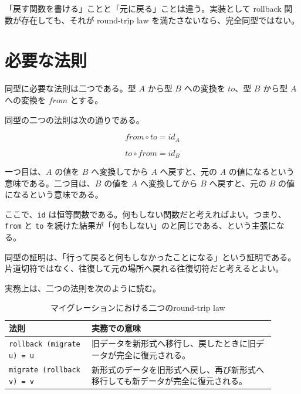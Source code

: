 
\begin{warningbox}
「戻す関数を書ける」ことと「元に戻る」ことは違う。実装として rollback 関数が存在しても、それが round-trip law を満たさないなら、完全同型ではない。
\end{warningbox}

\section{必要な法則}
\label{sec:ch06-laws}

同型に必要な法則は二つである。型 $A$ から型 $B$ への変換を $\mathit{to}$、型 $B$ から型 $A$ への変換を $\mathit{from}$ とする。

\begin{definitionbox}
同型の二つの法則は次の通りである。

\[
  \mathit{from} \circ \mathit{to} = \mathit{id}_A
\]

\[
  \mathit{to} \circ \mathit{from} = \mathit{id}_B
\]

一つ目は、$A$ の値を $B$ へ変換してから $A$ へ戻すと、元の $A$ の値になるという意味である。二つ目は、$B$ の値を $A$ へ変換してから $B$ へ戻すと、元の $B$ の値になるという意味である。
\end{definitionbox}

ここで、\texttt{id} は恒等関数である。何もしない関数だと考えればよい。つまり、\texttt{from} と \texttt{to} を続けた結果が「何もしない」のと同じである、という主張になる。

\begin{intuitionbox}
同型の証明は、「行って戻ると何もしなかったことになる」という証明である。片道切符ではなく、往復して元の場所へ戻れる往復切符だと考えるとよい。
\end{intuitionbox}

実務上は、二つの法則を次のように読む。

\begin{table}[htbp]
\centering
\begin{tabular}{p{0.28\linewidth}p{0.62\linewidth}}
\toprule
法則 & 実務での意味 \\
\midrule
\texttt{rollback (migrate u) = u} & 旧データを新形式へ移行し、戻したときに旧データが完全に復元される。 \\
\texttt{migrate (rollback v) = v} & 新形式のデータを旧形式へ戻し、再び新形式へ移行しても新データが完全に復元される。 \\
\bottomrule
\end{tabular}
\caption{マイグレーションにおける二つのround-trip law}
\label{tab:ch06-round-trip-laws}
\end{table}

